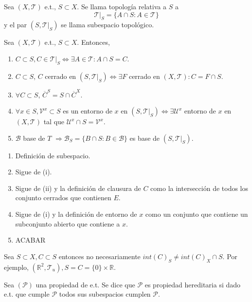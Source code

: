 \begin{defn}[Subespacio]
  Sea $( X, \mathcal{T} )$ e.t., $S \subset X$. Se llama topología relativa a $S$ a 
  \[ 
    \mathcal{T}|_{S} = \{ A \cap S : A \in \mathcal{T} \}  
  \] 
  y el par $( S, \mathcal{T}|_{S} )$ se llama subespacio topológico.
\end{defn}

\begin{prop}
  Sea $( X, \mathcal{T} )$ e.t., $S \subset X$. Entonces,
  \begin{enumerate}[label=(\roman*)]
    \item $C \subset S, C \in \mathcal{T}|_{S} \Leftrightarrow \exists A \in \mathcal{T} : A \cap S = C$.
    \item $C \subset S$, $C$ cerrado en $( S, \mathcal{T}|_{S}) \Leftrightarrow \exists F$ cerrado en $( X, \mathcal{T} ): C = F \cap S$.
    \item $\forall C \subset S$, $\overline{C}^{S} = S \cap \overline{C}^{X}$.
    \item $\forall x \in S, \mathcal{V}^{x} \subset S$ es un entorno de $x$ en $( S, \mathcal{T}|_{S} ) \Leftrightarrow \exists \mathcal{U}^{x}$ entorno de $x$ en $( X, \mathcal{T} )$ tal que $\mathcal{U}^{x} \cap S = \mathcal{V}^{x}$.
    \item $\mathcal{B}$ base de $T$ $\Rightarrow \mathcal{B}_{S} = \{  B \cap S : B \in \mathcal{B} \}$ es base de $( S, \mathcal{T}|_{S} )$.
  \end{enumerate}
\end{prop}

\begin{dem}
  \begin{enumerate}[label=(\roman*)]
    \item Definición de subespacio.
    \item Sigue de (i).
    \item Sigue de (ii) y la definición de clausura de $C$ como la intersección de todos los conjunto cerrados que contienen $E$.
    \item Sigue de (i) y la definición de entorno de $x$ como un conjunto que contiene un subconjunto abierto que contiene a $x$.
    \item ACABAR
  \end{enumerate}
\end{dem}

\begin{obs}
  Sea $S \subset X, C \subset S$ entonces no necesariamente $int(C)_{S} \neq int(C)_{X} \cap S$. Por ejemplo, $ ( \mathbb{R}^{2}, \mathcal{T}_{u}), S = C = \{ 0 \} \times \mathbb{R}$.
\end{obs}

\begin{defn}
  Sea $(\mathcal{P})$ una propiedad de e.t. Se dice que $\mathcal{P}$ es propiedad hereditaria si dado e.t. que cumple $\mathcal{P}$ todos sus subespacios cumplen $\mathcal{P}$.
\end{defn}
